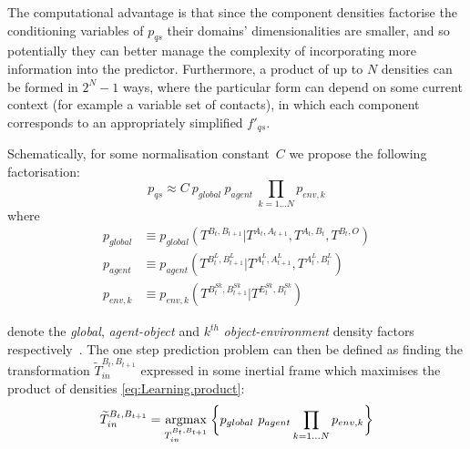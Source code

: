 The computational advantage is that since the component
densities factorise the conditioning variables of $p_{qs}$ their
domains' dimensionalities are smaller, and so potentially they can
better manage the complexity of incorporating more information into
the predictor.  Furthermore, a product of up to $N$ densities can be
formed in $2^N - 1$ ways, where the particular form can depend on some
current context (for example a variable set of contacts), in which
each component corresponds to an appropriately simplified $f'_{qs}$.

Schematically, for some normalisation constant~$C$ we propose the
following factorisation:
\begin{equation}
p_{qs} \approx C\ p_{global}\ p_{agent}\ \mathop{\prod}_{k=1 \ldots N}{ p_{env,k}}
\label{eq:Learning.product}
\end{equation}
\noindent where
\begin{subequations}
\begin{align}
p_{global} &\equiv p_{global}(T^{B_{t}, B_{t+1}}|T^{A_{t}, A_{t+1}}, T^{A_t, B_t}, T^{B_t, O})
\label{eq:Learning.densityglobal} \\
p_{agent} &\equiv p_{agent}(T^{B^{L}_{t}, B^{L}_{t+1}}|T^{A^{L}_{t}, A^{L}_{t+1}}, T^{A^{L}_t, B^{L}_t})
\label{eq:Learning.densitylocal} \\
p_{env,k} &\equiv p_{env,k}(T^{B^{Sk}_t, B^{Sk}_{t+1}} | T^{E^{Sk}_t,B^{Sk}_t})
\label{eq:Learning.densityenv}
\end{align}
\end{subequations}

\noindent denote the \textit{global}, \textit{agent-object} and
$k^{th}$ \textit{object-environment} density factors
respectively~\cite{kopicki_prediction_2009}\cite{kopicki_prediction_2010}. %
The one step prediction problem can then be defined as finding the
transformation $\widetilde{T}_{in}^{B_{t}, B_{t+1}}$ expressed in some inertial frame which maximises the product of densities \eqref{eq:Learning.product}:
\begin{equation}
\widetilde{T}_{in}^{B_{t}, B_{t+1}} = \argmax{T_{in}^{B_{t}, B_{t+1}}} \bigg\lbrace
p_{global}\  p_{agent} \mathop{\prod}_{k=1 \ldots N}{ p_{env,k} }
\bigg\rbrace
\label{eq:Learning.MultiFactorProduct}
\end{equation}

